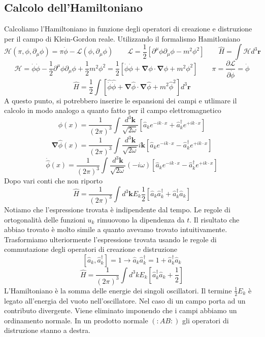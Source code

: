 \subsection{Calcolo dell'Hamiltoniano}
Calcoliamo l'Hamiltoniano in funzione degli operatori di creazione e distruzione per il campo di Klein-Gordon reale. Utilizzando il formalismo Hamitloniano
$$
\mathcal{H}(\pi, \phi, \partial_\mu \phi) = \pi\dot{\phi} - \mathcal{L}(\phi, \partial_\mu \phi) \qquad \mathcal{L} = \frac{1}{2}[\partial^\mu \phi \partial_\mu \phi - m^2 \phi^2] \qquad \hat{H} = \int \mathcal{H} d^3\mathbf{r}
$$
$$
\mathcal{H} = \dot{\phi}\dot{\phi} - \frac{1}{2}\partial^\mu \phi \partial_\mu \phi + \frac{1}{2}m^2 \phi^2 = \frac{1}{2}[\dot{\phi}\dot{\phi} + \boldsymbol{\nabla}\phi \cdot \boldsymbol{\nabla}\phi + m^2\phi^2] \qquad\pi = \frac{\partial \mathcal{L}}{\partial \dot{\phi}} = \dot{\phi}
$$
$$
\hat{H} = \frac{1}{2} \int [\hat{\dot{\phi}}\hat{\dot{\phi}} + \boldsymbol{\nabla}\hat{\phi} \cdot \boldsymbol{\nabla}\hat{\phi} + m^2\hat{\phi}^2] d^3\mathbf{r}
$$
A questo punto, si potrebbero inserire le espansioni dei campi e utlimare il calcolo in modo analogo a quanto fatto per il campo elettromagnetico
$$
\hat{\phi}(x) = \frac{1}{(2\pi)^3} \int \frac{d^3\mathbf{k}}{\sqrt{2\omega}} [\hat{a}_k e^{-ik\cdot x} + \hat{a}_k^\dagger e^{+ik\cdot x}]
$$
$$
\boldsymbol{\nabla}\hat{\phi}(x) = \frac{1}{(2\pi)^3} \int \frac{d^3\mathbf{k}}{\sqrt{2\omega}} i\mathbf{k} [\hat{a}_k e^{-ik\cdot x} - \hat{a}_k^\dagger e^{+ik\cdot x}]
$$
$$
\dot{\hat{\phi}}(x) = \frac{1}{(2\pi)^3} \int \frac{d^3\mathbf{k}}{\sqrt{2\omega}} (-i\omega) [\hat{a}_k e^{-ik\cdot x} - \hat{a}_k^\dagger e^{+ik\cdot x}]
$$
Dopo vari conti che non riporto 
$$
\hat{H} = \frac{1}{(2\pi)^3} \int d^3\mathbf{k} E_k \frac{1}{2} [\hat{a}_k \hat{a}_k^\dagger + \hat{a}_k^\dagger \hat{a}_k]
$$
Notiamo che l'espressione trovata è indipendente dal tempo. Le regole di ortogonalità delle funzioni $u_k$ rimuovono la dipendenza da $t$. Il risultato che abbiao trovato è molto simile a quanto avevamo trovato intuitivamente. Trasformiamo ulteriormente l'espressione trovata usando le regole di commutazione degli operatori di creazione e distruzione
$$
[\hat{a}_k, \hat{a}_k^\dagger] = 1 \to \hat{a}_k \hat{a}_k^\dagger = 1 + \hat{a}_k^\dagger \hat{a}_k
$$
$$
\hat{H} = \frac{1}{(2\pi)^3} \int d^3k E_k \left[ \hat{a}_k^\dagger \hat{a}_k + \frac{1}{2} \right]
$$
L'Hamiltoniano è la somma delle energie dei singoli oscillatori. Il termine $\frac{1}{2}E_k$ è legato all'energia del vuoto nell'oscillatore. Nel caso di un campo porta ad un contributo divergente. Viene eliminato imponendo che i campi abbiamo un ordinamento normale. In un prodotto normale $\left(:AB:\right)$ gli operatori di distruzione stanno a destra.

